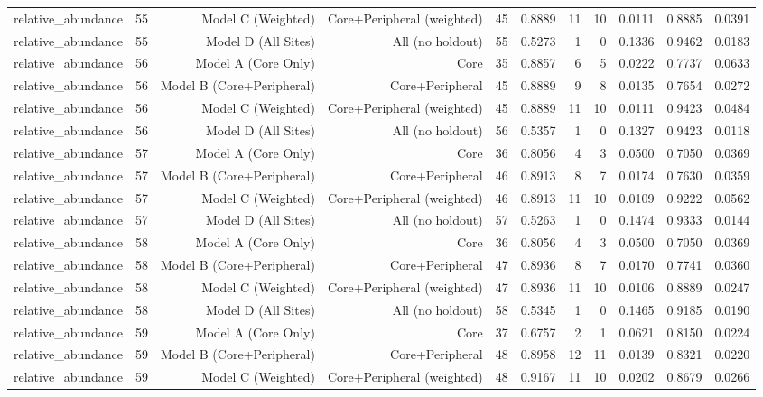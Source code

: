 {\begin{longtable}{lrrrrrrrrrr}
  relative\_abundance & 55 & Model C (Weighted) & Core+Peripheral (weighted) & 45 & 0.8889 & 11 & 10 & 0.0111 & 0.8885 & 0.0391 \\
  relative\_abundance & 55 & Model D (All Sites) & All (no holdout) & 55 & 0.5273 & 1 & 0 & 0.1336 & 0.9462 & 0.0183 \\
  relative\_abundance & 56 & Model A (Core Only) & Core & 35 & 0.8857 & 6 & 5 & 0.0222 & 0.7737 & 0.0633 \\
  relative\_abundance & 56 & Model B (Core+Peripheral) & Core+Peripheral & 45 & 0.8889 & 9 & 8 & 0.0135 & 0.7654 & 0.0272 \\
  relative\_abundance & 56 & Model C (Weighted) & Core+Peripheral (weighted) & 45 & 0.8889 & 11 & 10 & 0.0111 & 0.9423 & 0.0484 \\
  relative\_abundance & 56 & Model D (All Sites) & All (no holdout) & 56 & 0.5357 & 1 & 0 & 0.1327 & 0.9423 & 0.0118 \\
  relative\_abundance & 57 & Model A (Core Only) & Core & 36 & 0.8056 & 4 & 3 & 0.0500 & 0.7050 & 0.0369 \\
  relative\_abundance & 57 & Model B (Core+Peripheral) & Core+Peripheral & 46 & 0.8913 & 8 & 7 & 0.0174 & 0.7630 & 0.0359 \\
  relative\_abundance & 57 & Model C (Weighted) & Core+Peripheral (weighted) & 46 & 0.8913 & 11 & 10 & 0.0109 & 0.9222 & 0.0562 \\
  relative\_abundance & 57 & Model D (All Sites) & All (no holdout) & 57 & 0.5263 & 1 & 0 & 0.1474 & 0.9333 & 0.0144 \\
  relative\_abundance & 58 & Model A (Core Only) & Core & 36 & 0.8056 & 4 & 3 & 0.0500 & 0.7050 & 0.0369 \\
  relative\_abundance & 58 & Model B (Core+Peripheral) & Core+Peripheral & 47 & 0.8936 & 8 & 7 & 0.0170 & 0.7741 & 0.0360 \\
  relative\_abundance & 58 & Model C (Weighted) & Core+Peripheral (weighted) & 47 & 0.8936 & 11 & 10 & 0.0106 & 0.8889 & 0.0247 \\
  relative\_abundance & 58 & Model D (All Sites) & All (no holdout) & 58 & 0.5345 & 1 & 0 & 0.1465 & 0.9185 & 0.0190 \\
  relative\_abundance & 59 & Model A (Core Only) & Core & 37 & 0.6757 & 2 & 1 & 0.0621 & 0.8150 & 0.0224 \\
  relative\_abundance & 59 & Model B (Core+Peripheral) & Core+Peripheral & 48 & 0.8958 & 12 & 11 & 0.0139 & 0.8321 & 0.0220 \\
  relative\_abundance & 59 & Model C (Weighted) & Core+Peripheral (weighted) & 48 & 0.9167 & 11 & 10 & 0.0202 & 0.8679 & 0.0266 \\

\end{longtable}}
